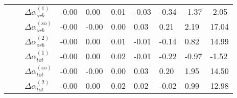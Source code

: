 \begin{longtable}{llllllllll}
      &         & $\Delta \alpha_{orb}^{(\text{1})}$ &   -0.00 &    0.00 &     0.01 &           -0.03 &          -0.34 &       -1.37 &       -2.05 \\
      &         & $\Delta \alpha_{orb}^{(\text{so})}$ &   -0.00 &   -0.00 &     0.00 &            0.03 &           0.21 &        2.19 &       17.04 \\
      &         & $\Delta \alpha_{orb}^{(\text{2})}$ &   -0.00 &    0.00 &     0.01 &           -0.01 &          -0.14 &        0.82 &       14.99 \\
      &         & $\Delta \alpha_{tot}^{(\text{1})}$ &   -0.00 &    0.00 &     0.02 &           -0.01 &          -0.22 &       -0.97 &       -1.52 \\
      &         & $\Delta \alpha_{tot}^{(\text{so})}$ &   -0.00 &   -0.00 &     0.00 &            0.03 &           0.20 &        1.95 &       14.50 \\
      &         & $\Delta \alpha_{tot}^{(\text{2})}$ &   -0.00 &    0.00 &     0.02 &            0.02 &          -0.02 &        0.99 &       12.98 \\
\end{longtable}

